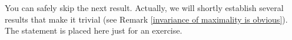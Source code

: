 \documentclass{report}
\begin{document}




You can safely skip the next result. Actually, we will shortly establish several results that make it trivial (see Remark \ref{invariance of maximality is obvious}). The statement is placed here just for an exercise.
\end{document}
